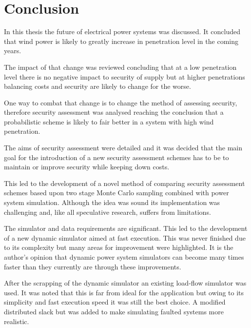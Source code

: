 \documentclass[a4paper,oneside,12pt]{report}
\begin{document}







\chapter{Conclusion}

In this thesis the future of electrical power systems was discussed. It concluded that wind power is likely to greatly increase in penetration level in the coming years.

The impact of that change was reviewed concluding that at a low penetration level there is no negative impact to security of supply but at higher penetrations balancing costs and security are likely to change for the worse.

One way to combat that change is to change the method of assessing security, therefore security assessment was analysed reaching the conclusion that a probabilistic scheme is likely to fair better in a system with high wind penetration.

The aims of security assessment were detailed and it was decided that the main goal for the introduction of a new security assessment schemes has to be to maintain or improve security while keeping down costs.

This led to the development of a novel method of comparing security assessment schemes based upon two stage Monte Carlo sampling combined with power system simulation. Although the idea was sound its implementation was challenging and, like all speculative research, suffers from limitations.

The simulator and data requirements are significant. This led to the development of a new dynamic simulator aimed at fast execution. This was never finished due to its complexity but many areas for improvement were highlighted. It is the author's opinion that dynamic power system simulators can become many times faster than they currently are through these improvements.

After the scrapping of the dynamic simulator an existing load-flow simulator was used. It was noted that this is far from ideal for the application but owing to its simplicity and fast execution speed it was still the best choice. A modified distributed slack but was added to make simulating faulted systems more realistic.
\end{document}
